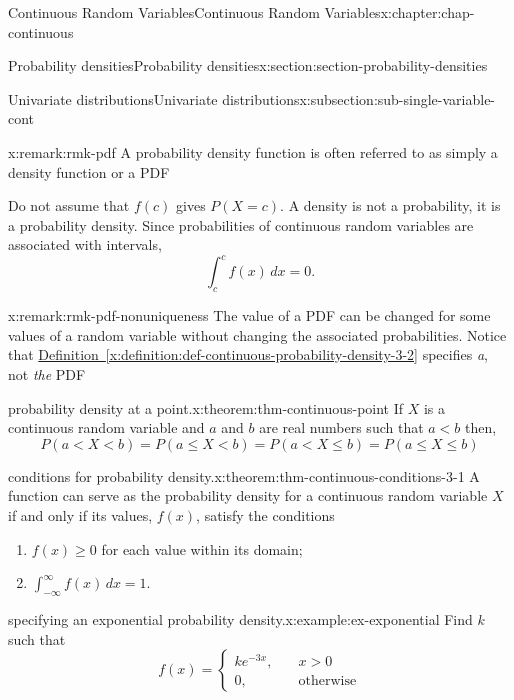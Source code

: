 \documentclass[oneside,10pt,]{book}
\newcommand{\xreffont}{\relax}
\numberwithin{equation}{section}
\newcommand{\lt}{<}
\newcommand{\gt}{>}
\newcommand{\amp}{&}
\begin{document}
\begin{chapterptx}{Continuous Random Variables}{}{Continuous Random Variables}{}{}{x:chapter:chap-continuous}
\begin{sectionptx}{Probability densities}{}{Probability densities}{}{}{x:section:section-probability-densities}
\begin{subsectionptx}{Univariate distributions}{}{Univariate distributions}{}{}{x:subsection:sub-single-variable-cont}
\begin{remark}{}{x:remark:rmk-pdf}%
A probability density function is often referred to as simply a density function or a PDF%
\end{remark}
Do not assume that \(f(c)\) gives \(P(X = c)\). A density is not a probability, it is a probability density. Since probabilities of continuous random variables are associated with intervals,%
\begin{equation*}
\int_c^c
f(x)\,dx = 0\text{.}
\end{equation*}
%
\begin{remark}{}{x:remark:rmk-pdf-nonuniqueness}%
The value of a PDF can be changed for some values of a random variable without changing the associated probabilities.  Notice that \hyperref[x:definition:def-continuous-probability-density-3-2]{Definition~{\xreffont\ref{x:definition:def-continuous-probability-density-3-2}}} specifies \emph{a}, not \emph{the} PDF%
\end{remark}
\begin{theorem}{probability density at a point.}{}{x:theorem:thm-continuous-point}%
If \(X\) is a continuous random variable and \(a\) and \(b\) are real numbers such that \(a \lt b\) then,%
\begin{equation*}
P(a \lt X \lt b) = P(a \le X \lt b) = P(a \lt X \le b) = P(a \le X
\le b)
\end{equation*}
%
\end{theorem}
\begin{theorem}{conditions for probability density.}{}{x:theorem:thm-continuous-conditions-3-1}%
A function can serve as the probability density for a continuous random variable \(X\) if and only if its values, \(f(x)\), satisfy the conditions%
\begin{enumerate}
\item{}\(f(x) \ge 0\) for each value within its domain;%
\item{}\(\int_{-\infty}^\infty f(x)\,dx = 1\).%
\end{enumerate}
%
\end{theorem}
\begin{example}{specifying an exponential probability density.}{x:example:ex-exponential}%
Find \(k\) such that%
\begin{equation*}
f(x) = \begin{cases}ke^{-3x},\amp \quad x \gt 0\\
0, \amp \quad \text{otherwise}\end{cases}
\end{equation*}

\end{example}
\end{subsectionptx}
\end{sectionptx}
\end{chapterptx}
\end{document}
